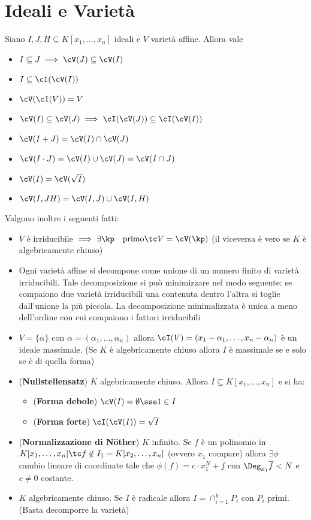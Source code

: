 \documentclass[a4paper,NoNotes,GeneralMath]{stdmdoc}
\begin{document}
	\section*{Ideali e Varietà}
	Siano $I, J, H \subseteq K[x_1, \ldots, x_n]$ ideali e $V$ varietà affine. Allora vale
	\begin{itemize}
		\item $I \subseteq J \implies \cV(J) \subseteq \cV(I)$
		\item $I \subseteq \cI(\cV(I))$
		\item $\cV(\cI(V)) = V$
		\item $\cV(I) \subseteq \cV(J) \implies \cI(\cV(J)) \subseteq \cI(\cV(I))$
		\item $\cV(I + J) = \cV(I) \cap \cV(J)$
		\item $\cV(I\cdot J) = \cV(I) \cup \cV(J) = \cV(I \cap J)$
		\item $\cV(I) = \cV(\sqrt{I})$
		\item $\cV(I, JH) = \cV(I, J) \cup \cV(I, H)$
	\end{itemize}
	Valgono inoltre i seguenti fatti:
	\begin{itemize}
		\item $V$ è irriducibile $\implies \exists \kp \quad \text{primo} \tc V = \cV(\kp)$ (il viceversa è vero se $K$ è algebricamente chiuso)
		\item Ogni varietà affine si decompone come unione di un numero finito di varietà irriducibili. Tale decomposizione si può minimizzare nel modo seguente: se compaiono due varietà irriducibili una contenuta dentro l'altra si toglie dall'unione la più piccola. La decomposizione minimalizzata è unica a meno dell'ordine con cui compaiono i fattori irriducibili
		\item $V = \{\alpha\}$ con $\alpha = (\alpha_1, \ldots, \alpha_n)$ allora $\cI(V) = (x_1 - \alpha_1, \ldots, x_n - \alpha_n)$ è un ideale massimale. (Se $K$ è algebricamente chiuso allora $I$ è massimale se e solo se è di quella forma)
		\item ({\bf Nullstellensatz}) $K$ algebricamente chiuso. Allora $I \subseteq K[x_1, \ldots, x_n]$ e si ha:
			\begin{itemize}
				\item ({\bf Forma debole}) $\cV(I) = \emptyset \sse 1 \in I$
				\item ({\bf Forma forte}) $\cI(\cV(I)) = \sqrt{I}$
			\end{itemize}
		\item ({\bf Normalizzazione di Nöther}) $K$ infinito. Se $f$ è un polinomio in $K[x_1, \ldots, x_n] \tc f \notin I_1 = K[x_2, \ldots, x_n]$ (ovvero $x_1$ compare) allora $\exists \phi$ cambio lineare di coordinate tale che $\phi(f) = c \cdot x_1^N + \overline{f}$ con $\Deg_{x_1} \overline{f} < N$ e $c \neq 0$ costante. 
		\item $K$ algebricamente chiuso. Se $I$ è radicale allora $I = \cap_{i=1}^k P_i$ con $P_i$ primi. (Basta decomporre la varietà)
	\end{itemize}
	
\end{document}
